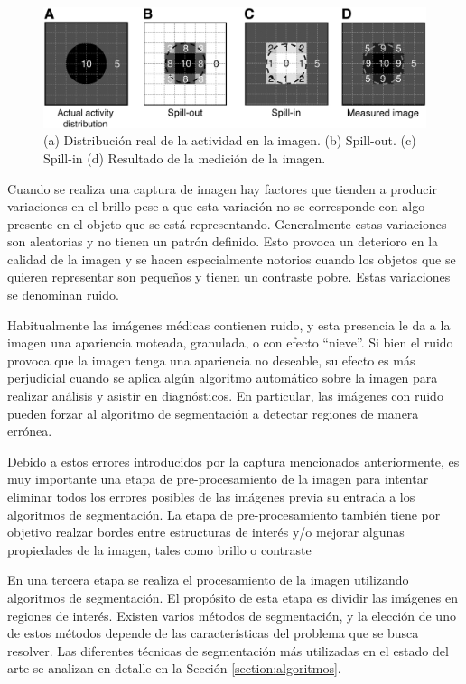 \begin{figure}[H]
\centering
\includegraphics[scale=0.15]{images/spill.jpg}
\caption{(a) Distribución real de la actividad en la imagen. (b) Spill-out. (c) Spill-in (d) Resultado de la medición de la imagen.}
\label{fig:spill}
\end{figure}

Cuando se realiza una captura de imagen hay factores que tienden a producir variaciones en el brillo pese a que esta variación no se corresponde con algo presente en el objeto que se está representando. Generalmente estas variaciones son aleatorias y no tienen un patrón definido. Esto provoca un deterioro en la calidad de la imagen y se hacen especialmente notorios cuando los objetos que se quieren representar son pequeños y tienen un contraste pobre. Estas variaciones se denominan ruido.

Habitualmente las imágenes médicas contienen ruido, y esta presencia le da a la imagen una apariencia moteada, granulada, o con efecto “nieve”. Si bien el ruido provoca que la imagen tenga una apariencia no deseable, su efecto es más perjudicial cuando se aplica algún algoritmo automático sobre la imagen para realizar análisis y asistir en diagnósticos. En particular, las imágenes con ruido pueden forzar al algoritmo de segmentación a detectar regiones de manera errónea.

Debido a estos errores introducidos por la captura mencionados anteriormente, es muy importante una etapa de pre-procesamiento de la imagen para intentar eliminar todos los errores posibles de las imágenes previa su entrada a los algoritmos de segmentación. La etapa de pre-procesamiento también tiene por objetivo realzar bordes entre estructuras de interés y/o mejorar algunas propiedades de la imagen, tales como brillo o contraste \citep{bankman2008handbook}

En una tercera etapa se realiza el procesamiento de la imagen utilizando algoritmos de segmentación. El propósito de esta etapa es dividir las imágenes en regiones de interés. Existen varios métodos de segmentación, y la elección de uno de estos métodos depende de las características del problema que se busca resolver. Las diferentes técnicas de segmentación más utilizadas en el estado del arte se analizan en detalle en la Sección \ref{section:algoritmos}.

